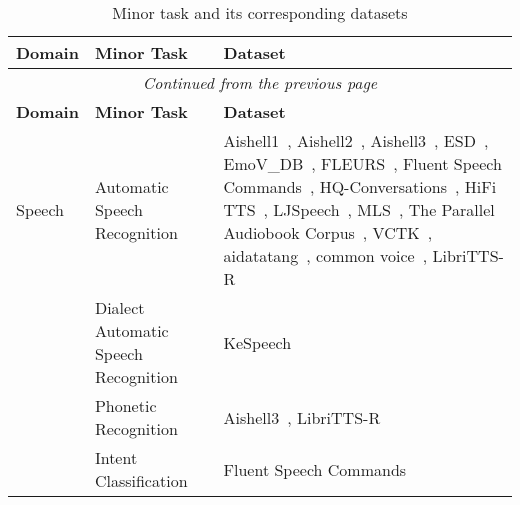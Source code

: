 \onecolumn
\begin{longtable}{p{1cm}p{6cm}p{6cm}}   %
\caption{Minor task and its corresponding datasets}  %
\label{tab:task2dataset}  %
\\  %
\hline
\textbf{Domain} &  \textbf{Minor Task} &   \textbf{Dataset} \\
\hline
\endfirsthead  %
\multicolumn{3}{|c|}{\textit{Continued from the previous page}} \\  %
\hline
\textbf{Domain} &  \textbf{Minor Task}  &  \textbf{Dataset} \\
\hline
\endhead  %
\hline
\endfoot  %
\hline
\endlastfoot  %

Speech & Automatic Speech Recognition & Aishell1~\citep{bu2017aishell}, Aishell2~\citep{du2018aishell}, Aishell3~\citep{shi2020aishell}, ESD~\citep{zhou2022emotional}, EmoV\_DB~\citep{adigwe2018emotional}, FLEURS~\citep{conneau2023fleurs}, Fluent Speech Commands~\citep{lugosch2019speech}, HQ-Conversations~\citep{xia2024iscslp}, HiFi TTS~\citep{bakhturina2021hi}, LJSpeech~\citep{ljspeech17}, MLS~\citep{Pratap2020MLSAL}, The Parallel Audiobook Corpus~\citep{pacorpus18}, VCTK~\citep{veaux2017cstr}, aidatatang~\citep{aidatatang200zh}, common voice~\citep{ardila2019common}, LibriTTS-R~\citep{koizumi2023librittsr} \\
    \cline{2-3} %

    \multirow{35}{*}{} & Dialect Automatic Speech Recognition & KeSpeech~\citep{tang2021kespeech} \\  \cline{2-3}


    & Phonetic Recognition & Aishell3~\citep{shi2020aishell}, LibriTTS-R~\citep{koizumi2023librittsr} \\ \cline{2-3}

    & Intent Classification &  Fluent Speech Commands~\citep{qian2021speech} \\ \cline{2-3} 




\end{longtable}

